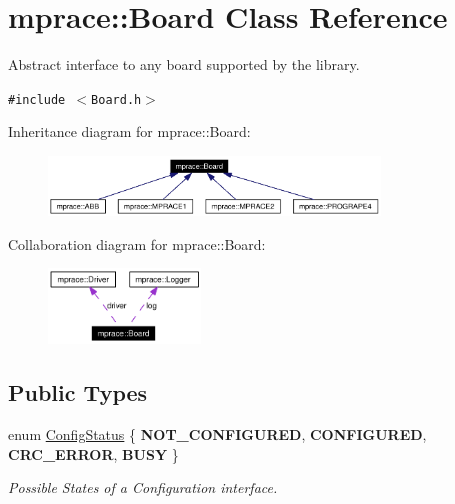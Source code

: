 \hypertarget{classmprace_1_1Board}{
\section{mprace::Board Class Reference}
\label{classmprace_1_1Board}
}
Abstract interface to any board supported by the library.  


{\tt \#include $<$Board.h$>$}

Inheritance diagram for mprace::Board:\begin{figure}[H]
\begin{center}
\leavevmode
\includegraphics[width=250pt]{classmprace_1_1Board__inherit__graph}
\end{center}
\end{figure}
Collaboration diagram for mprace::Board:\begin{figure}[H]
\begin{center}
\leavevmode
\includegraphics[width=115pt]{classmprace_1_1Board__coll__graph}
\end{center}
\end{figure}
\subsection*{Public Types}
\begin{CompactItemize}
\item 
enum \hyperlink{classmprace_1_1Board_w4}{Config\-Status} \{ {\bf NOT\_\-CONFIGURED}, 
{\bf CONFIGURED}, 
{\bf CRC\_\-ERROR}, 
{\bf BUSY}
 \}
\begin{CompactList}\small\item\em Possible States of a Configuration interface. \item\end{CompactList}\end{CompactItemize}
